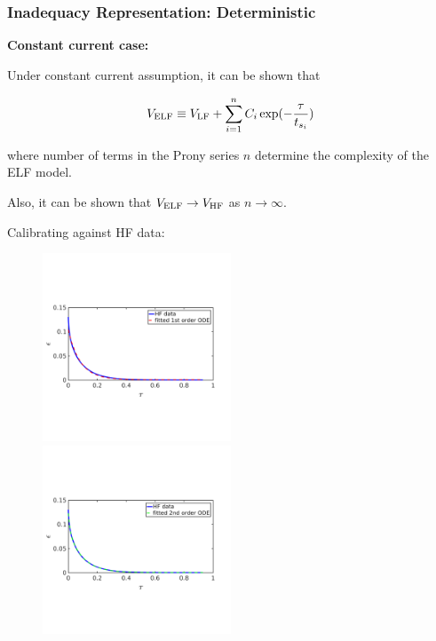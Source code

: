 \documentclass[10pt,xcolor=dvipsnames,compress]{beamer}
\begin{document}
\begin{frame}
\frametitle{Inadequacy Representation: Deterministic}
\vfill


\textbf{Constant current case:}

Under constant current assumption, it can be shown that

\begin{equation*}
V_{\rm ELF}  \equiv V_{\rm LF} + \sum_{i = 1}^n C_i \exp(-\frac{\tau}{t_{s_i}})
\end{equation*}

where number of terms in the Prony series $n$ determine the complexity of the ELF model.

Also, it can be shown that $V_{\rm ELF} \rightarrow V_{\rm HF}$ as $n \rightarrow \infty$.

Calibrating against HF data:
\begin{figure}
\includegraphics[trim = 0.in 2.4in 0.in 2.8in, clip, width=0.5\textwidth]{figs/Iconst_eps_modelfit_1st.png}
~
\includegraphics[trim = 0.in 2.4in 0.in 2.8in, clip, width=0.5\textwidth]{figs/Iconst_eps_modelfit_2nd.png}
\end{figure}


\vfill
\end{frame}
\end{document}

